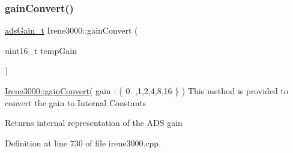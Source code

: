 \subsubsection{\texorpdfstring{gain\+Convert()}{gainConvert()}}
{\footnotesize\ttfamily \hyperlink{_cool_adafruit___a_d_s1015_8h_a3d6c0e15829a207b9155890811fa4781}{ads\+Gain\+\_\+t} Irene3000\+::gain\+Convert (\begin{DoxyParamCaption}\item[{uint16\+\_\+t}]{temp\+Gain }\end{DoxyParamCaption})}

\hyperlink{class_irene3000_abcad62d1201a59f8dd3ba87048002728}{Irene3000\+::gain\+Convert}( gain \+: \{ 0. ,1,2,4,8,16 \} ) This method is provided to convert the gain to Internal Constants

\begin{DoxyReturn}{Returns}
internal representation of the A\+DS gain 
\end{DoxyReturn}


Definition at line 730 of file irene3000.\+cpp.


